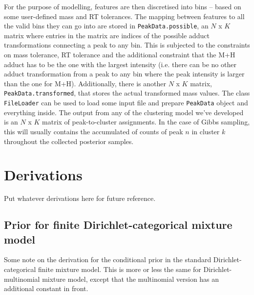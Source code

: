 \documentclass[12pt,a4paper]{article}
\begin{document}
For the purpose of modelling, features are then discretised into bins -- based on some user-defined mass and RT tolerances. The mapping between features to all the valid bins they can go into are stored in \texttt{\small{}PeakData.possible}, an $N$ x $K$ matrix where entries in the matrix are indices of the possible adduct transformations connecting a peak to any bin. This is subjected to the constraints on mass tolerance, RT tolerance and the additional constraint that the M+H adduct has to be the one with the largest intensity (i.e. there can be no other adduct transformation from a peak to any bin where the peak intensity is larger than the one for M+H). Additionally, there is another $N$ x $K$ matrix, \texttt{\small{}PeakData.transformed}, that stores the actual transformed mass values. The class \texttt{\small{}FileLoader} can be used to load some input file and prepare \texttt{\small{}PeakData} object and everything inside. The output from any of the clustering model we've developed is an $N$ x $K$ matrix of peak-to-cluster assignments. In the case of Gibbs sampling, this will usually contains the accumulated of counts of peak $n$ in cluster $k$ throughout the collected posterior samples.

\section{Derivations}

Put whatever derivations here for future reference.

\subsection{Prior for finite Dirichlet-categorical mixture model}

Some note on the derivation for the conditional prior in the standard Dirichlet-categorical finite mixture model. This is more or less the same for Dirichlet-multinomial mixture model, except that the multinomial version has an additional constant in front.
\end{document}
